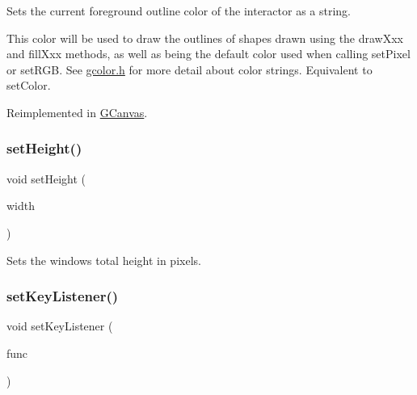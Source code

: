 Sets the current foreground outline color of the interactor as a string. 

This color will be used to draw the outlines of shapes drawn using the draw\+Xxx and fill\+Xxx methods, as well as being the default color used when calling set\+Pixel or set\+R\+GB. See \mbox{\hyperlink{gcolor_8h_source}{gcolor.\+h}} for more detail about color strings. Equivalent to set\+Color. 

Reimplemented in \mbox{\hyperlink{classsgl_1_1GCanvas_a8afbcf1f47750fb4c717f9ff36540235}{G\+Canvas}}.

\mbox{\label{classsgl_1_1GWindow_a4b812426e19cdd9f6d62e7b5d90e6bec}} 
\subsubsection{\texorpdfstring{set\+Height()}{setHeight()}}
{\footnotesize\ttfamily void set\+Height (\begin{DoxyParamCaption}\item[{double}]{width }\end{DoxyParamCaption})\hspace{0.3cm}{\ttfamily [virtual]}}



Sets the window\textquotesingle{}s total height in pixels. 

\mbox{\label{classsgl_1_1GWindow_aeb8324d3287fa1fbe093f4d6230cf0a6}} 
\subsubsection{\texorpdfstring{set\+Key\+Listener()}{setKeyListener()}\hspace{0.1cm}{\footnotesize\ttfamily [1/2]}}
{\footnotesize\ttfamily void set\+Key\+Listener (\begin{DoxyParamCaption}\item[{\mbox{\hyperlink{namespacesgl_ae9f3e9eab70035da1a2b114e21357b25}{G\+Event\+Listener}}}]{func }\end{DoxyParamCaption})\hspace{0.3cm}{\ttfamily [virtual]}}



